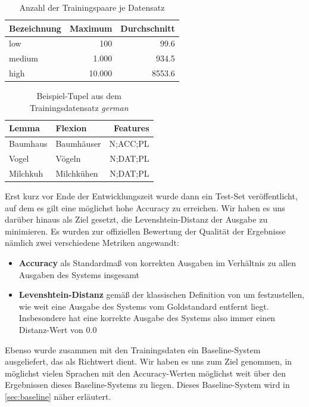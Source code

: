 \documentclass[11pt,a4paper]{article}
\newcommand{\lang}[1]{\textit{#1}}
\begin{document}
\begin{table}[htb]
\centering
\begin{tabular}{lrr}
\toprule
Bezeichnung & Maximum & Durchschnitt\\
\midrule
low & 100 & 99.6\\
medium & 1.000 & 934.5\\
high & 10.000 & 8553.6\\
\bottomrule
\end{tabular}
\caption{Anzahl der Trainingspaare je Datensatz}
\label{fig:training-volumes}
\end{table}

\begin{table}[htb]
\centering
\begin{tabular}{llr}
\toprule
Lemma & Flexion & Features\\
\midrule
Baumhaus & Baumhäuser & N;ACC;PL\\
Vogel & Vögeln & N;DAT;PL\\
Milchkuh & Milchkühen & N;DAT;PL\\
\bottomrule
\end{tabular}
\caption{Beispiel-Tupel aus dem Trainingsdatensatz \lang{german}}
\label{fig:german-declension}
\end{table}

Erst kurz vor Ende der Entwicklungszeit wurde dann ein Test-Set veröffentlicht, auf dem es gilt eine möglichst hohe Accuracy zu erreichen.
Wir haben es uns darüber hinaus als Ziel gesetzt, die Levenshtein-Distanz der Ausgabe zu minimieren. Es wurden zur offiziellen Bewertung der Qualität der Ergebnisse nämlich zwei verschiedene Metriken angewandt:
\begin{itemize}
    \item \textbf{Accuracy} als Standardmaß von korrekten Ausgaben im Verhältnis zu allen Ausgaben des Systems insgesamt
    \item \textbf{Levenshtein-Distanz} gemäß der klassischen Definition von \citet{levenshtein:binary66} um festzustellen, wie weit eine Ausgabe des Systems vom Goldstandard entfernt liegt. Insbesondere hat eine korrekte Ausgabe des Systems also immer einen Distanz-Wert von $0.0$
\end{itemize}
Ebenso wurde zusammen mit den Trainingsdaten ein Baseline-System ausgeliefert, das als Richtwert dient. Wir haben es uns zum Ziel genommen, in möglichst vielen Sprachen mit den Accuracy-Werten möglichst weit über den Ergebnissen dieses Baseline-Systems zu liegen.
Dieses Baseline-System wird in \autoref{sec:baseline} näher erläutert.
\end{document}
